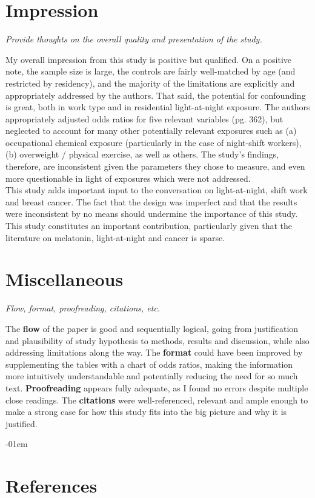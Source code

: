 \documentclass{article}
\begin{document}
\begin{multicols}{2}
\section*{Impression}
\emph{Provide thoughts on the overall quality and presentation of the study.}\\
\vspace{1mm}

My overall impression from this study is positive but qualified.  On a positive note, the sample size is large, the controls are fairly well-matched by age (and restricted by residency), and the majority of the limitations are explicitly and appropriately addressed by the authors.  That said, the potential for confounding is great, both in work type and in residential light-at-night exposure.  The authors appropriately adjusted odds ratios for five relevant variables (pg. 362), but neglected to account for many other potentially relevant exposures such as (a) occupational chemical exposure (particularly in the case of night-shift workers), (b) overweight / physical exercise, as well as others.  The study's findings, therefore, are inconsistent given the parameters they chose to measure, and even more questionable in light of exposures which were not addressed.\\

This study adds important input to the conversation on light-at-night, shift work and breast cancer.  The fact that the design was imperfect and that the results were inconsistent by no means should undermine the importance of this study.  This study constitutes an important contribution, particularly given that the literature on melatonin, light-at-night and cancer is sparse.

\section*{Miscellaneous}
\emph{Flow, format, proofreading, citations, etc.}\\
\vspace{1mm}

The \textbf{flow} of the paper is good and sequentially logical, going from justification and plausibility of study hypothesis to methods, results and discussion, while also addressing limitations along the way.  The \textbf{format} could have been improved by supplementing the tables with a chart of odds ratios, making the information more intuitively understandable and potentially reducing the need for so much text.  \textbf{Proofreading} appears fully adequate, as I found no errors despite multiple close readings.  The \textbf{citations} were well-referenced, relevant and ample enough to make a strong case for how this study fits into the big picture and why it is justified.  

\end{multicols}

\openup -01em
\section*{References}
\theendnotes
\end{document}
